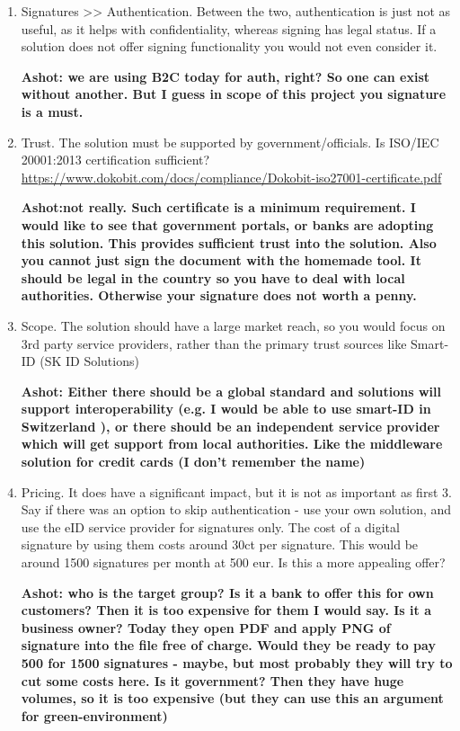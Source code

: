 \begin{enumerate}
    \item Signatures >> Authentication. Between the two, authentication is just not as useful, as it helps with confidentiality, whereas signing has legal status. If a solution does not offer signing functionality you would not even consider it.
    
    \textbf{Ashot: we are using B2C today for auth, right? So one can exist without another. But I guess in scope of this project you signature is a must.}

    \item Trust. The solution must be supported by government/officials. Is ISO/IEC 20001:2013 certification sufficient? \url{https://www.dokobit.com/docs/compliance/Dokobit-iso27001-certificate.pdf}
    
    \textbf{Ashot:not really. Such certificate is a minimum requirement. I would like to see that government portals, or banks are adopting this solution. This provides sufficient trust into the solution. Also you cannot just sign the document with the homemade tool. It should be legal in the country so you have to deal with local authorities. Otherwise your signature does not worth a penny.}

    \item Scope. The solution should have a large market reach, so you would focus on 3rd party service providers, rather than the primary trust sources like Smart-ID (SK ID Solutions)
    
    \textbf{Ashot: Either there should be a global standard and solutions will support interoperability (e.g. I would be able to use smart-ID in Switzerland ), or there should be an independent service provider which will get support from local authorities. Like the middleware solution for credit cards (I don't remember the name)}

    \item {Pricing. It does have a significant impact, but it is not as important as first 3. Say if there was an option to skip authentication - use your own solution, and use the eID service provider for signatures only. The cost of a digital signature by using them costs around 30ct per signature. This would be around 1500 signatures per month at 500 eur. Is this a more appealing offer?}
    
    \textbf{Ashot: who is the target group? Is it a bank to offer this for own customers? Then it is too expensive for them I would say. Is it a business owner? Today they open PDF and apply PNG of signature into the file free of charge. Would they be ready to pay 500 for 1500 signatures - maybe, but most probably they will try to cut some costs here. Is it government? Then they have huge volumes, so it is too expensive (but they can use this an argument for green-environment)}



\end{enumerate}
